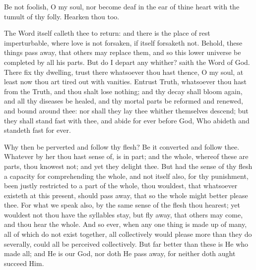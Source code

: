\documentclass[b5paper,openright,12pt,twoside]{book}
\begin{document}
Be not foolish, O my soul, nor become deaf in the ear of thine heart
with the tumult of thy folly. Hearken thou too.

The Word itself calleth thee to return: and there is the place of rest
imperturbable, where love is not forsaken, if itself forsaketh not.
Behold, these things pass away, that others may replace them, and so
this lower universe be completed by all his parts. But do I depart any
whither? saith the Word of God. There fix thy dwelling, trust there
whatsoever thou hast thence, O my soul, at least now thou art tired out
with vanities. Entrust Truth, whatsoever thou hast from the Truth, and
thou shalt lose nothing; and thy decay shall bloom again, and all thy
diseases be healed, and thy mortal parts be reformed and renewed, and
bound around thee: nor shall they lay thee whither themselves descend;
but they shall stand fast with thee, and abide for ever before God, Who
abideth and standeth fast for ever.

Why then be perverted and follow thy flesh? Be it converted and follow
thee. Whatever by her thou hast sense of, is in part; and the whole,
whereof these are parts, thou knowest not; and yet they delight thee.
But had the sense of thy flesh a capacity for comprehending the whole,
and not itself also, for thy punishment, been justly restricted to
a part of the whole, thou wouldest, that whatsoever existeth at this
present, should pass away, that so the whole might better please thee.
For what we speak also, by the same sense of the flesh thou hearest; yet
wouldest not thou have the syllables stay, but fly away, that others may
come, and thou hear the whole. And so ever, when any one thing is made
up of many, all of which do not exist together, all collectively would
please more than they do severally, could all be perceived collectively.
But far better than these is He who made all; and He is our God, nor
doth He pass away, for neither doth aught succeed Him.
\end{document}
